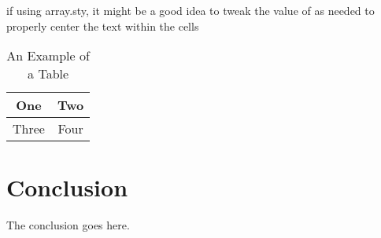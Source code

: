 \documentclass[conference]{IEEEtran}
\begin{document}
\begin{table}[!t]
\renewcommand{\arraystretch}{1.3}
if using array.sty, it might be a good idea to tweak the value of
\extrarowheight as needed to properly center the text within the cells
\caption{An Example of a Table}
\label{table_example}
\centering
\begin{tabular}{|c||c|}
\hline
One & Two\\
\hline
Three & Four\\
\hline
\end{tabular}
\end{table}






\section{Conclusion}
The conclusion goes here.






%
%
%




\end{document}
